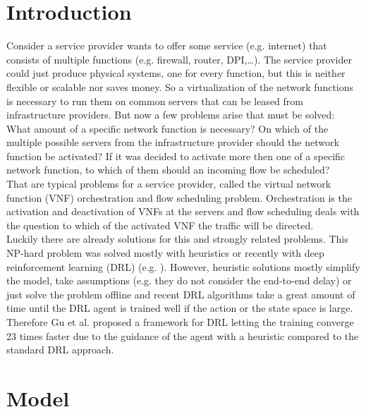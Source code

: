 \section{Introduction}%
\label{sec:introduction}
Consider a service provider wants to offer some service (e.g. internet) that consists of multiple functions (e.g. firewall, router, DPI,\dots). The service provider could just produce physical systems, one for every function, but this is neither flexible or scalable nor saves money. So a virtualization of the network functions is necessary to run them on common servers that can be leased from infrastructure providers. But now a few problems arise that must be solved: What amount of a specific network function is necessary? On which of the multiple possible servers from the infrastructure provider should the network function be activated? If it was decided to activate more then one of a specific network function, to which of them should an incoming flow be scheduled?\\
That are typical problems for a service provider, called the virtual network function (VNF) orchestration and flow scheduling problem. Orchestration is the activation and deactivation of VNFs at the servers and flow scheduling deals with the question to which of the activated VNF the traffic will be directed.  \\
Luckily there are already solutions for this and strongly related problems. This NP-hard problem was solved mostly with heuristics
or recently with deep reinforcement learning (DRL) (e.g. \cite{Guz}). However, heuristic solutions mostly simplify the model, take assumptions (e.g. they do not consider the end-to-end delay) or just solve the problem offline and recent DRL algorithms take a great amount of time until the DRL agent is trained well if the action or the state space is large. Therefore Gu et al. \cite{Gu} proposed a framework for DRL letting the training converge 23 times faster due to the guidance of the agent with a heuristic compared to the standard DRL approach.



\section{Model} %
\label{sec:model}

